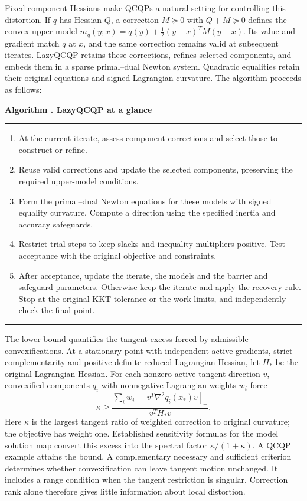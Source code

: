 \documentclass[pdflatex,sn-mathphys-num]{sn-jnl}
\theoremstyle{thmstyleone}
\theoremstyle{thmstylethree}
\newcounter{algorithm}
\newenvironment{method}[1]{\refstepcounter{algorithm}\par\medskip
  \noindent\textbf{Algorithm \thealgorithm. #1}\par\smallskip\hrule\smallskip}
  {\smallskip\hrule\medskip}
\begin{document}
Fixed component Hessians make QCQPs a natural setting for controlling
this distortion. If $q$ has Hessian $Q$, a correction $M\succeq0$ with
$Q+M\succeq0$ defines the convex upper model
$m_q(y;x)=q(y)+\tfrac12(y-x)^TM(y-x)$.
Its value and gradient match $q$ at $x$, and the same correction remains
valid at subsequent iterates. LazyQCQP retains these corrections,
refines selected components, and embeds them in a sparse primal--dual
Newton system. Quadratic equalities retain their original equations
and signed Lagrangian curvature. The algorithm proceeds as follows:

\begin{method}{LazyQCQP at a glance}\label{alg:lazy}
\begin{enumerate}[leftmargin=1.7em]
\item At the current iterate, assess component corrections and select
      those to construct or refine.
\item Reuse valid corrections and update the selected components,
      preserving the required upper-model conditions.
\item Form the primal--dual Newton equations for these models with signed
      equality curvature. Compute a direction using the specified
      inertia and accuracy safeguards.
\item Restrict trial steps to keep slacks and inequality multipliers
      positive. Test acceptance with the original objective and constraints.
\item After acceptance, update the iterate, the models and the barrier and
      safeguard parameters. Otherwise keep the iterate and apply the
      recovery rule. Stop at the original KKT tolerance or the work
      limits, and independently check the final point.
\end{enumerate}
\end{method}

The lower bound quantifies the tangent excess forced by admissible
convexifications. At a stationary point with independent active gradients, strict
complementarity and positive definite reduced Lagrangian Hessian,
let $H_*$ be the original Lagrangian Hessian. For each nonzero
active tangent direction $v$, convexified components $q_i$ with
nonnegative Lagrangian weights $w_i$ force
\[
 \kappa\geq
 \frac{\sum_i w_i[-v^T\nabla^2q_i(x_*)v]_+}{v^TH_*v}.
\]
Here $\kappa$ is the largest tangent ratio of weighted correction to
original curvature; the objective has weight one. Established
sensitivity formulas for the model solution map convert this excess into the spectral
factor $\kappa/(1+\kappa)$. A QCQP example attains the bound. A
complementary necessary and sufficient criterion determines whether
convexification can leave tangent motion unchanged. It includes a
range condition when the tangent restriction is singular. Correction
rank alone therefore gives little information about local distortion.
\end{document}

